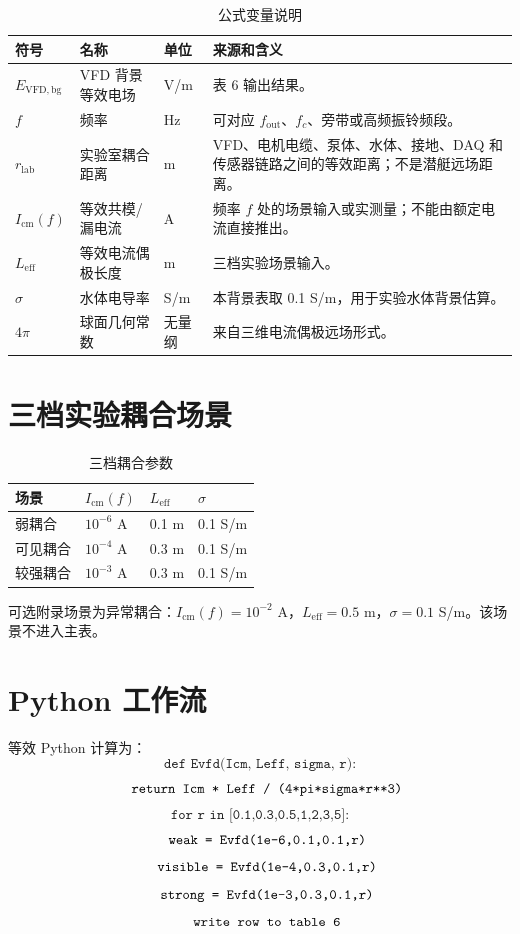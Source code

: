 \documentclass[UTF8,a4paper,11pt]{ctexart}
\begin{document}
\begin{longtable}{p{2.8cm}p{3.6cm}p{2.0cm}p{5.1cm}}
\caption{公式变量说明}\\
\toprule
符号 & 名称 & 单位 & 来源和含义\\
\midrule
$E_{\mathrm{VFD,bg}}$ & VFD 背景等效电场 & V/m & 表 6 输出结果。\\
$f$ & 频率 & Hz & 可对应 $f_{\mathrm{out}}$、$f_c$、旁带或高频振铃频段。\\
$r_{\mathrm{lab}}$ & 实验室耦合距离 & m & VFD、电机电缆、泵体、水体、接地、DAQ 和传感器链路之间的等效距离；不是潜艇远场距离。\\
$I_{\mathrm{cm}}(f)$ & 等效共模/漏电流 & A & 频率 $f$ 处的场景输入或实测量；不能由额定电流直接推出。\\
$L_{\mathrm{eff}}$ & 等效电流偶极长度 & m & 三档实验场景输入。\\
$\sigma$ & 水体电导率 & S/m & 本背景表取 0.1 S/m，用于实验水体背景估算。\\
$4\pi$ & 球面几何常数 & 无量纲 & 来自三维电流偶极远场形式。\\
\bottomrule
\end{longtable}

\section{三档实验耦合场景}
\begin{longtable}{p{2.6cm}p{3.2cm}p{3.2cm}p{3.2cm}}
\caption{三档耦合参数}\\
\toprule
场景 & $I_{\mathrm{cm}}(f)$ & $L_{\mathrm{eff}}$ & $\sigma$\\
\midrule
弱耦合 & $10^{-6}$ A & 0.1 m & 0.1 S/m\\
可见耦合 & $10^{-4}$ A & 0.3 m & 0.1 S/m\\
较强耦合 & $10^{-3}$ A & 0.3 m & 0.1 S/m\\
\bottomrule
\end{longtable}

可选附录场景为异常耦合：$I_{\mathrm{cm}}(f)=10^{-2}$ A，$L_{\mathrm{eff}}=0.5$ m，$\sigma=0.1$ S/m。该场景不进入主表。

\section{Python 工作流}
等效 Python 计算为：
\[
\texttt{def Evfd(Icm, Leff, sigma, r):}
\]
\[
\texttt{\quad return Icm * Leff / (4*pi*sigma*r**3)}
\]
\[
\texttt{for r in [0.1,0.3,0.5,1,2,3,5]:}
\]
\[
\texttt{\quad weak = Evfd(1e-6,0.1,0.1,r)}
\]
\[
\texttt{\quad visible = Evfd(1e-4,0.3,0.1,r)}
\]
\[
\texttt{\quad strong = Evfd(1e-3,0.3,0.1,r)}
\]
\[
\texttt{\quad write row to table 6}
\]
\end{document}
